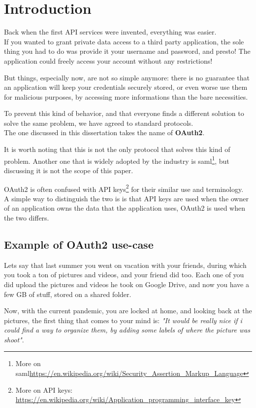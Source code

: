 \section{Introduction}
Back when the first API services were invented, everything was easier.
\\
If you wanted to grant private data access to a third party application,
the sole thing you had to do was provide it your username and password, and
presto!
The application could freely access your account without any restrictions!

But things, especially now, are not so simple anymore: there is no guarantee
that an application will keep your credentials securely stored, or even worse
use them for malicious purposes, by accessing more informations than the bare
necessities.

To prevent this kind of behavior, and that everyone finds a different solution
to solve the same problem, we have agreed to standard protocols.
\\
The one discussed in this dissertation takes the name of \textbf{OAuth2}.

It is worth noting that this is not the only protocol that solves this kind of problem.
Another one that is widely adopted by the industry is \acs{saml}\footnote{More on \acs{saml}\url{https://en.wikipedia.org/wiki/Security_Assertion_Markup_Language}}, but discussing it is not the scope of this paper.


OAuth2 is often confused with API keys\footnote{More on API keys:
\url{https://en.wikipedia.org/wiki/Application\_programming\_interface\_key}}
%
for their similar use and terminology.
\\
A simple way to distinguish the two is
is that API keys are used when the owner of an application owns the data that
the application uses, OAuth2 is used when the two differs.

\subsection{Example of OAuth2 use-case}

Lets say that last summer you went on vacation with your friends, during which
you took a ton of pictures and videos, and your friend did too.
Each one of you did upload the pictures and videos he took on Google Drive, and
now you have a few GB of stuff, stored on a shared folder.

Now, with the current pandemic, you are locked at home, and looking back at the pictures, the first thing that comes to your mind is:
\textit{"It would be really nice if i could find a way to organize them, by adding some labels of where the picture was shoot"}.

